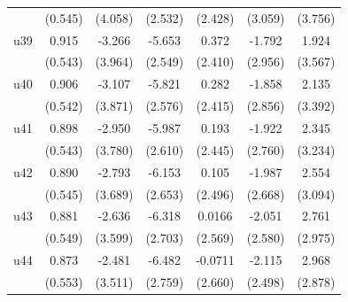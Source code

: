 \begin{table}[htbp]
\begin{tabular}{l*{6}{c}}
                    &     (0.545)         &     (4.058)         &     (2.532)         &     (2.428)         &     (3.059)         &     (3.756)         \\
\addlinespace
u39                 &       0.915\sym{*}  &      -3.266         &      -5.653\sym{**} &       0.372         &      -1.792         &       1.924         \\
                    &     (0.543)         &     (3.964)         &     (2.549)         &     (2.410)         &     (2.956)         &     (3.567)         \\
\addlinespace
u40                 &       0.906\sym{*}  &      -3.107         &      -5.821\sym{**} &       0.282         &      -1.858         &       2.135         \\
                    &     (0.542)         &     (3.871)         &     (2.576)         &     (2.415)         &     (2.856)         &     (3.392)         \\
\addlinespace
u41                 &       0.898\sym{*}  &      -2.950         &      -5.987\sym{**} &       0.193         &      -1.922         &       2.345         \\
                    &     (0.543)         &     (3.780)         &     (2.610)         &     (2.445)         &     (2.760)         &     (3.234)         \\
\addlinespace
u42                 &       0.890         &      -2.793         &      -6.153\sym{**} &       0.105         &      -1.987         &       2.554         \\
                    &     (0.545)         &     (3.689)         &     (2.653)         &     (2.496)         &     (2.668)         &     (3.094)         \\
\addlinespace
u43                 &       0.881         &      -2.636         &      -6.318\sym{**} &      0.0166         &      -2.051         &       2.761         \\
                    &     (0.549)         &     (3.599)         &     (2.703)         &     (2.569)         &     (2.580)         &     (2.975)         \\
\addlinespace
u44                 &       0.873         &      -2.481         &      -6.482\sym{**} &     -0.0711         &      -2.115         &       2.968         \\
                    &     (0.553)         &     (3.511)         &     (2.759)         &     (2.660)         &     (2.498)         &     (2.878)         \\

\end{tabular}
\end{table}
